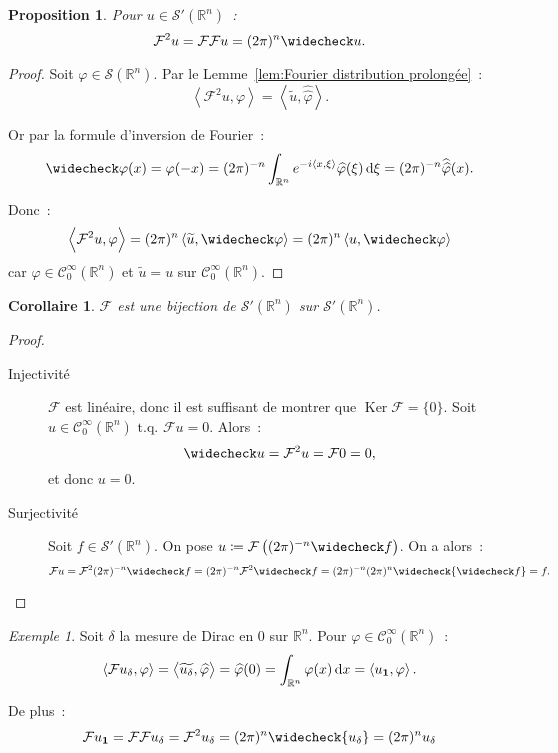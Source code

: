 \documentclass{report}
\DeclareMathOperator{\Ker}{Ker}
\newcommand{\R}{{\mathbb R}}
\newcommand{\scpr}[2]{\left\langle#1, #2\right\rangle}
\newcommand{\tq}{\text{ t.q. }}
\newcommand{\st}{\tq}
\newtheorem{prp}[thm]{Proposition}
\newtheorem{cor}[thm]{Corollaire}
\theoremstyle{definition}
\theoremstyle{remark}
\newtheorem{ex}{Exemple}[chapter]
\begin{document}
\begin{prp} Pour $u \in \mathcal S'(\R^n)$~:
\[\mathcal F^2u = \mathcal F\mathcal Fu = (2\pi)^n\widecheck u.\]
\end{prp}

\begin{proof} Soit $\varphi \in \mathcal S(\R^n)$. Par le Lemme~\ref{lem:Fourier distribution prolongée}~:
\[\scpr {\mathcal F^2u}\varphi = \scpr {\widetilde u}{\widehat {\widehat \varphi}}.\]

Or par la formule d'inversion de Fourier~:
\[\widecheck \varphi(x) = \varphi(-x) = (2\pi)^{-n}\int_{\R^n}e^{-i\scpr x\xi}\widehat \varphi(\xi)\dif \xi = (2\pi)^{-n}\widehat {\widehat \varphi}(x).\]

Donc~:
\[\scpr {\mathcal F^2u}\varphi = (2\pi)^n\scpr {\widetilde u}{\widecheck \varphi} = (2\pi)^n\scpr u{\widecheck \varphi}\]
car $\varphi \in \mathcal C^\infty_0(\R^n)$ et $\widetilde u = u$ sur $\mathcal C^\infty_0(\R^n)$.
\end{proof}

\begin{cor} $\mathcal F$ est une bijection de $\mathcal S'(\R^n)$ sur $\mathcal S'(\R^n)$.
\end{cor}

\begin{proof}~
\begin{description}
	\item[Injectivité] $\mathcal F$ est linéaire, donc il est suffisant de montrer que $\Ker\mathcal F = \{0\}$. Soit $u \in \mathcal C^\infty_0(\R^n) \st \mathcal Fu = 0$. Alors~:
	\[\widecheck u = \mathcal F^2u = \mathcal F0 = 0,\]
	et donc $u = 0$.
	\item[Surjectivité] Soit $f \in \mathcal S'(\R^n)$. On pose $u \coloneqq \mathcal F\left((2\pi)^{-n}\widecheck f\right)$. On a alors~:
	\[\mathcal Fu = \mathcal F^2(2\pi)^{-n}\widecheck f = (2\pi)^{-n}\mathcal F^2\widecheck f = (2\pi)^{-n}(2\pi)^n\widecheck {\widecheck f} = f.\]
\end{description}
\end{proof}

\begin{ex} Soit $\delta$ la mesure de Dirac en 0 sur $\R^n$. Pour $\varphi \in \mathcal C^\infty_0(\R^n)$~:
\[\scpr {\mathcal Fu_\delta}\varphi = \scpr {\widetilde {u_\delta}}{\widehat \varphi} = \widehat \varphi(0) = \int_{\R^n}\varphi(x)\dif x = \scpr {u_\mathbf 1}\varphi.\]

De plus~:
\[\mathcal Fu_{\mathbf 1} = \mathcal F\mathcal Fu_\delta = \mathcal F^2u_\delta = (2\pi)^n \widecheck {u_{\delta}} = (2\pi)^n u_{\delta}\]
\end{ex}
\end{document}
